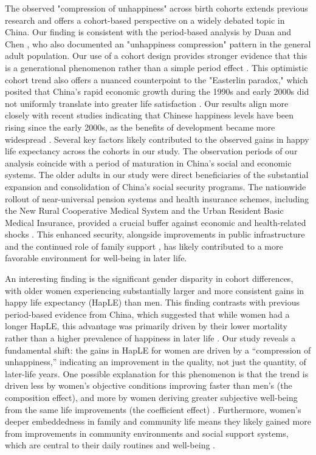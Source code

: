 \documentclass[12pt, a4paper]{article}
\begin{document}
The observed "compression of unhappiness" across birth cohorts extends previous research and offers a cohort-based perspective on a widely debated topic in China. Our finding  is consistent with the period-based analysis by Duan and Chen \autocite{duan.2020.happy}, who also documented an "unhappiness compression" pattern in the general adult population. Our use of a cohort design provides stronger evidence that this is a generational phenomenon rather than a simple period effect \autocite{payne.2022.expansion}. This optimistic cohort trend also offers a nuanced counterpoint to the "Easterlin paradox," which posited that China’s rapid economic growth during the 1990s and early 2000s did not uniformly translate into greater life satisfaction \autocite{easterlin.2012.chinas,knight.2011.does,graham.2017.happiness}. Our results align more closely with recent studies indicating that Chinese happiness levels have been rising since the early 2000s, as the benefits of development became more widespread \autocite{wang.2023.hierarchical,cai.2023.does}. Several key factors likely contributed to the observed gains in happy life expectancy across the cohorts in our study. The observation periods of our analysis coincide with a period of maturation in China's social and economic systems. The older adults in our study were direct beneficiaries of the substantial expansion and consolidation of China's social security programs. The nationwide rollout of near-universal pension systems and health insurance schemes, including the New Rural Cooperative Medical System and the Urban Resident Basic Medical Insurance, provided a crucial buffer against economic and health-related shocks \autocite{liu.2019.are,guo.2024.regional,cheng.2021.sociodemographic}. This enhanced security, alongside improvements in public infrastructure \autocite{dong.2017.exploring} and the continued role of family support \autocite{zhao.2023.chinas,huang.2021.intergenerational}, has likely contributed to a more favorable environment for well-being in later life.

An interesting finding is the significant gender disparity in cohort differences, with older women experiencing substantially larger and more consistent gains in happy life expectancy (HapLE) than men. This finding contrasts with previous period-based evidence from China, which suggested that while women had a longer HapLE, this advantage was primarily driven by their lower mortality rather than a higher prevalence of happiness in later life \autocite{duan.2020.happy}. Our study reveals a fundamental shift: the gains in HapLE for women are driven by a “compression of unhappiness,” indicating an improvement in the quality, not just the quantity, of later-life years. One possible explanation for this phenomenon is that the trend is driven less by women’s objective conditions improving faster than men’s (the composition effect), and more by women deriving greater subjective well-being from the same life improvements (the coefficient effect) \autocite{yang.2024.gender}. Furthermore, women’s deeper embeddedness in family and community life means they likely gained more from improvements in community environments and social support systems, which are central to their daily routines and well-being \autocite{feng.2024.gender}.
\end{document}
